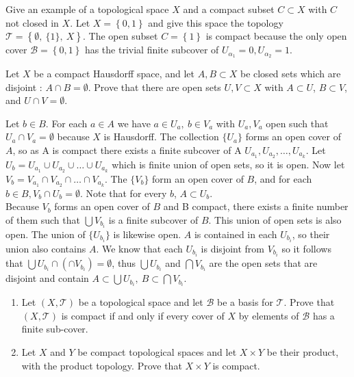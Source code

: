 \documentclass{jhwhw}
\newcommand{\T}{{\mathcal T}}
\newcommand{\B}{{\mathcal B}}
\begin{document}
\problem{} %
Give an example of a topological space $X$ and a compact subset $C\subset X$ with $C$ not closed in $X$.
\solution{}
Let $X=\left\{ 0,1\right\}$ and give this space the topology $\T=\left\{ \emptyset,\  \{1\},\ X\right\}$. The open subset $C=\left\{ 1\right\}$ is compact because the only open cover $\B =\left\{0,1\right\}$ has the trivial finite subcover of $U_{\alpha_1}=0, U_{\alpha_2}=1$. 


\problem{}%
Let $X$ be a compact Hausdorff space, and let $A,B\subset X$ be closed sets which are  disjoint : $A\cap B =\emptyset$.  Prove that there are open sets $U,V\subset X$ with $A\subset U$, $B\subset V$, and $U\cap V = \emptyset$. 

\solution{}
Let $b \in B$. For each $a \in A$ we have $a \in U_a ,\ b \in V_a $ with $U_a, V_a$ open such that $U_a \cap V_a = \emptyset$ because $X$ is Hausdorff. The collection $\{U_a\}$ forms an open cover of $A$, so as A is compact there exists a finite subcover of A $U_{a_1}, U_{a_2}, \ldots, U_{a_k}$. Let $U_b = U_{a_1} \cup U_{a_2} \cup \dots \cup U_{a_k}$ which is finite union of open sets, so it is open. Now let $V_b = V_{a_1} \cap V_{a_2} \cap \dots \cap V_{a_k}$. The $\{V_b\}$ form an open cover of $B$, and for each $b \in B, V_b \cap U_b = \emptyset$.  Note that for every $b$, $A \subset U_b$. 
\\

Because $V_b$ forms an open cover of $B$ and B compact, there exists a finite number of them such that $ \bigcup V_{b_i}$ is a finite subcover of $B$. This union of open sets is also open. The union of $\{U_{b_i}\}$ is likewise open. $A$ is contained in each $U_{b_i}$, so their union also contains $A$. We know that each $U_{b_i}$ is disjoint from $V_{b_i}$ so it follows that $\bigcup U_{b_i} \cap \left( \cap V_{b_i} \right) = \emptyset$, thus $\bigcup U_{b_i}$ and $\bigcap V_{b_i}$ are the open sets that are disjoint and contain $A\subset\bigcup U_{b_i} ,\ B\subset\bigcap V_{b_i} $.  



\problem{}%
\begin{enumerate}
	\item Let $(X,\T)$ be a topological space and let $\B$ be a basis for $\T$.  Prove that $(X,\T)$ is compact if and only if every cover of $X$ by elements of $\B$ has a finite sub-cover. 
	\item Let $X$ and $Y$ be compact topological spaces and let $X\times Y$ be their product, with the product topology.   Prove that $X\times Y$ is compact.
	
\end{enumerate}
\solution{}
\end{document}
